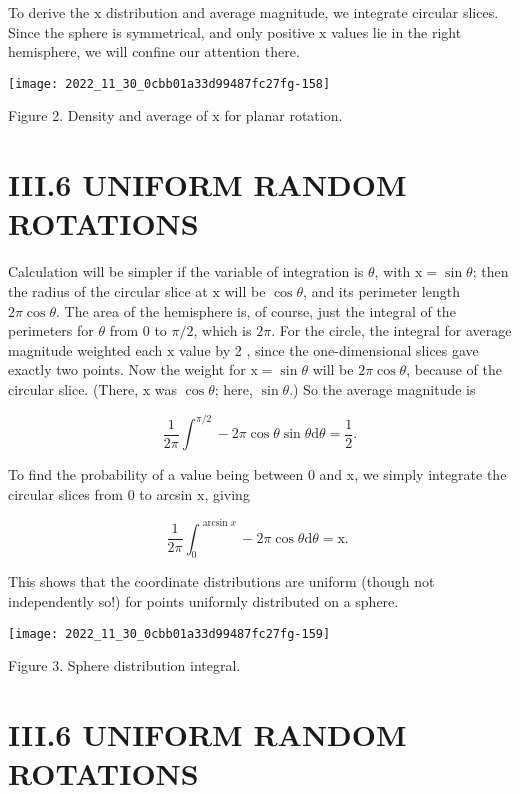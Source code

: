 To derive the $\mathrm{x}$ distribution and average magnitude, we integrate circular slices. Since the sphere is symmetrical, and only positive $\mathrm{x}$ values lie in the right hemisphere, we will confine our attention there.

\begin{center}
\texttt{[image: 2022\_11\_30\_0cbb01a33d99487fc27fg-158]}
\end{center}

Figure 2. Density and average of $\mathrm{x}$ for planar rotation.

\section{III.6 UNIFORM RANDOM ROTATIONS}
Calculation will be simpler if the variable of integration is $\theta$, with $\mathrm{x}=\sin \theta$; then the radius of the circular slice at $\mathrm{x}$ will be $\cos \theta$, and its perimeter length $2 \pi \cos \theta$. The area of the hemisphere is, of course, just the integral of the perimeters for $\theta$ from 0 to $\pi / 2$, which is $2 \pi$. For the circle, the integral for average magnitude weighted each $\mathrm{x}$ value by 2 , since the one-dimensional slices gave exactly two points. Now the weight for $\mathrm{x}=\sin \theta$ will be $2 \pi \cos \theta$, because of the circular slice. (There, $\mathrm{x}$ was $\cos \theta$; here, $\sin \theta$.) So the average magnitude is

$$
\frac{1}{2 \pi} \int^{\pi / 2}-2 \pi \cos \theta \sin \theta \mathrm{d} \theta=\frac{1}{2} .
$$

To find the probability of a value being between 0 and $\mathrm{x}$, we simply integrate the circular slices from 0 to arcsin $\mathrm{x}$, giving

$$
\frac{1}{2 \pi} \int_{0}^{\arcsin x}-2 \pi \cos \theta \mathrm{d} \theta=\mathrm{x} \text {. }
$$

This shows that the coordinate distributions are uniform (though not independently so!) for points uniformly distributed on a sphere.

\begin{center}
\texttt{[image: 2022\_11\_30\_0cbb01a33d99487fc27fg-159]}
\end{center}

Figure 3. Sphere distribution integral.

\section{III.6 UNIFORM RANDOM ROTATIONS}
